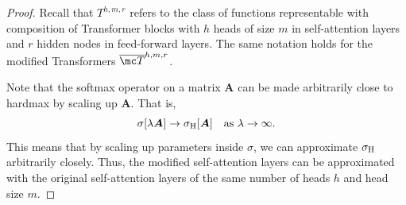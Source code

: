 \documentclass{article} %
\def\mA{{\bm{A}}}
\newcommand{\sfmx}{\sigma}
\newcommand{\hdmx}{\sigma_{\rm H}}
\begin{document}
\begin{proof}
Recall that $T^{h,m,r}$ refers to the class of functions representable with composition of Transformer blocks with $h$ heads of size $m$ in self-attention layers and $r$ hidden nodes in feed-forward layers. The same notation holds for the modified Transformers $\overline {\mc T}^{h,m,r}$.

Note that the softmax operator on a matrix $\mA$ can be made arbitrarily close to hardmax by scaling up $\mA$. That is,
\begin{equation*}
    \sfmx[\lambda \mA] \rightarrow \hdmx[\mA] ~~ \text{ as } \lambda \rightarrow \infty.
\end{equation*}
This means that by scaling up parameters inside $\sfmx$, we can approximate $\hdmx$ arbitrarily closely. Thus, the modified self-attention layers can be approximated with the original self-attention layers of the same number of heads $h$ and head size $m$.


\end{proof}
\end{document}
